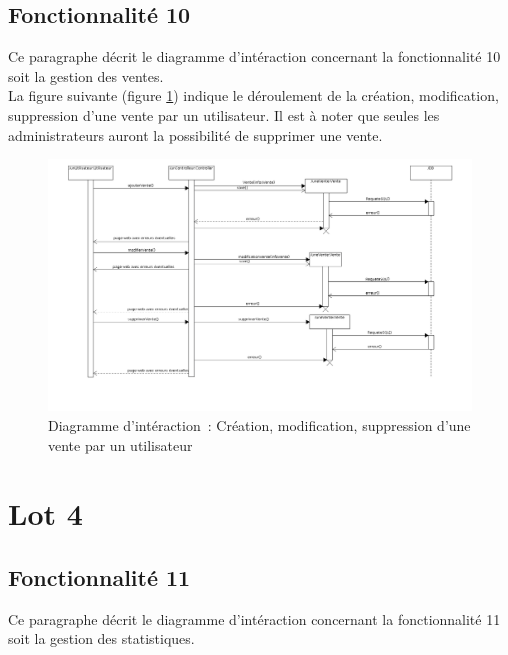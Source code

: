\subsection{Fonctionnalité 10}
Ce paragraphe décrit le diagramme d'intéraction concernant la fonctionnalité 10 soit la gestion des ventes. \\

La figure suivante (figure \ref{diagrammeInteraction3}) indique le déroulement de la création, modification, suppression d’une vente par un utilisateur. Il est à noter que seules les administrateurs auront la possibilité de supprimer une vente.
\begin{figure}[H]
	\centering
	\includegraphics[scale=0.35]{images/diagrammesInteraction/03_diagrammeInteractionF10.png}
	\caption{Diagramme d'intéraction~: Création, modification, suppression d’une vente par un utilisateur}
	\label{diagrammeInteraction3}
\end{figure}


\section{Lot 4}
\subsection{Fonctionnalité 11}
Ce paragraphe décrit le diagramme d'intéraction concernant la fonctionnalité 11 soit la gestion des statistiques. \\

